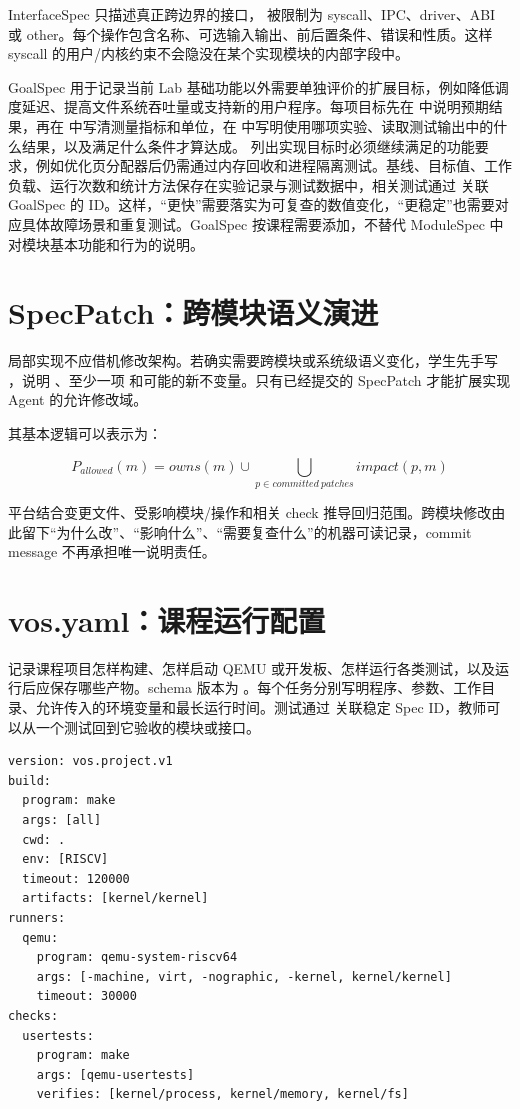 InterfaceSpec 只描述真正跨边界的接口， 被限制为 syscall、IPC、driver、ABI 或 other。每个操作包含名称、可选输入输出、前后置条件、错误和性质。这样 syscall 的用户/内核约束不会隐没在某个实现模块的内部字段中。

GoalSpec 用于记录当前 Lab 基础功能以外需要单独评价的扩展目标，例如降低调度延迟、提高文件系统吞吐量或支持新的用户程序。每项目标先在  中说明预期结果，再在  中写清测量指标和单位，在  中写明使用哪项实验、读取测试输出中的什么结果，以及满足什么条件才算达成。 列出实现目标时必须继续满足的功能要求，例如优化页分配器后仍需通过内存回收和进程隔离测试。基线、目标值、工作负载、运行次数和统计方法保存在实验记录与测试数据中，相关测试通过  关联 GoalSpec 的 ID。这样，``更快''需要落实为可复查的数值变化，``更稳定''也需要对应具体故障场景和重复测试。GoalSpec 按课程需要添加，不替代 ModuleSpec 中对模块基本功能和行为的说明。

\section{SpecPatch：跨模块语义演进}

局部实现不应借机修改架构。若确实需要跨模块或系统级语义变化，学生先手写 ，说明 、至少一项  和可能的新不变量。只有已经提交的 SpecPatch 才能扩展实现 Agent 的允许修改域。

其基本逻辑可以表示为：

\begin{equation}
  P_{allowed}(m) = owns(m) \cup \bigcup_{p \in committed\ patches} impact(p,m)
\end{equation}

平台结合变更文件、受影响模块/操作和相关 check 推导回归范围。跨模块修改由此留下``为什么改''、``影响什么''、``需要复查什么''的机器可读记录，commit message 不再承担唯一说明责任。

\section{vos.yaml：课程运行配置}

 记录课程项目怎样构建、怎样启动 QEMU 或开发板、怎样运行各类测试，以及运行后应保存哪些产物。schema 版本为 。每个任务分别写明程序、参数、工作目录、允许传入的环境变量和最长运行时间。测试通过  关联稳定 Spec ID，教师可以从一个测试回到它验收的模块或接口。

\begin{lstlisting}[language={},caption={结构化命令投影示例}]
version: vos.project.v1
build:
  program: make
  args: [all]
  cwd: .
  env: [RISCV]
  timeout: 120000
  artifacts: [kernel/kernel]
runners:
  qemu:
    program: qemu-system-riscv64
    args: [-machine, virt, -nographic, -kernel, kernel/kernel]
    timeout: 30000
checks:
  usertests:
    program: make
    args: [qemu-usertests]
    verifies: [kernel/process, kernel/memory, kernel/fs]
\end{lstlisting}

